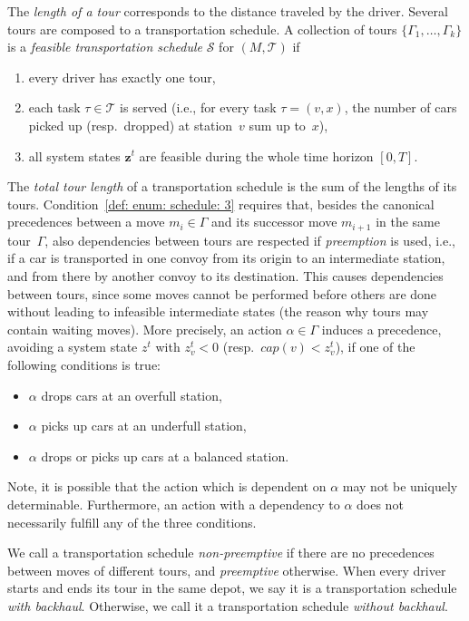 \documentclass[english]{llncs}
\numberwithin{sublemma}{lemma}
\newcommand{\ndriver}{\ensuremath{k}}
\newcommand{\taskset}{\ensuremath{\mathcal{T}}}
\newcommand{\tourd}{\ensuremath{\Gamma}}
\newcommand{\action}{\ensuremath{\alpha}}
\newcommand{\move}{\ensuremath{m}}
\newcommand{\sched}{\mathcal{S}}
\newcommand{\z}{\boldsymbol{z}}
\begin{document}
The \emph{length of a tour} corresponds to the distance traveled by the driver.
Several tours are composed to a transportation schedule. 
A collection of tours $\{\tourd_1, \ldots, \tourd_\ndriver \}$ is a \emph{feasible transportation schedule} $\sched$ for $(M, \taskset)$ if 
\begin{enumerate}
 \item\label{def: enum: schedule: 1} every driver has exactly one tour,
 \item\label{def: enum: schedule: 2} each task $\tau \in \taskset$ is served (i.e., for every task $\tau = (v, x)$, the number of cars picked up (resp.~dropped) at station~$v$ sum up to~$x$),
 \item\label{def: enum: schedule: 3} all system states $\z^t$ are feasible during the whole time horizon $[0, T]$. 
\end{enumerate}
The \emph{total tour length} of a transportation schedule is the sum of the lengths of its tours.
Condition~\ref{def: enum: schedule: 3} requires that, besides the canonical precedences between a move $\move_i \in \tourd$ and its successor move $\move_{i+1}$ in the same tour~$\tourd$,
also dependencies between tours are respected
if \emph{preemption} is used, i.e., if a car is transported in one convoy from its origin to an intermediate station, and from there by another convoy to its destination.
This causes dependencies between tours, since some moves cannot be performed before others are done without leading to infeasible intermediate states (the reason why tours may contain waiting moves).
More precisely, an action $\action \in \tourd$ induces a precedence, avoiding a system state $z^t$ with $z^t_v < 0$ (resp.~$cap(v) < z^t_v$),
if one of the following conditions is true:
\begin{itemize}
\item $\action$ drops cars at an overfull station,
\item $\action$ picks up cars at an underfull station,
\item $\action$ drops or picks up cars at a balanced station.
\end{itemize}
Note, it is possible that the action which is dependent on $\action$ may not be uniquely determinable.
Furthermore, an action with a dependency to $\action$ does not necessarily fulfill any of the three conditions.



We call a transportation schedule \emph{non-preemptive} if there are no precedences between moves of different tours, and \emph{preemptive} otherwise.
When every driver starts and ends its tour in the same depot, we say it is a transportation schedule \emph{with backhaul}.
Otherwise, we call it a transportation schedule \emph{without backhaul}.
\end{document}
